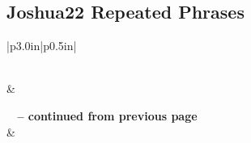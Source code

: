 \subsection{Joshua22 Repeated Phrases}


\normalsize
 
\begin{center}
\begin{longtable}{|p{3.0in}|p{0.5in}|}
\caption[Joshua22 Repeated Phrases]{Joshua22 Repeated Phrases}\label{table:Repeated Phrases Joshua22} \\
\hline {} &  \\ \hline 
\endfirsthead
 
{{\bfseries \tablename\ \thetable{} -- continued from previous page}} \\  
\hline {} &  \\ \hline 
\endhead
 

\end{longtable}
\end{center}
